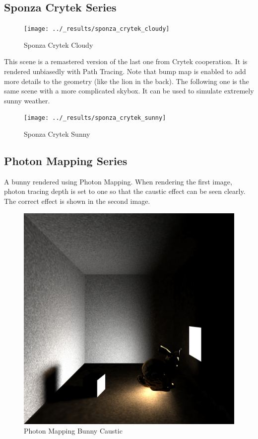 \documentclass[utf8]{article}
\begin{document}
\subsection{Sponza Crytek Series}
\begin{figure}[H]
	\centering
	\texttt{[image: ../\_results/sponza\_crytek\_cloudy]}
	\caption{Sponza Crytek Cloudy}
	\label{fig:sponzacrytekcloudy}
\end{figure}
This scene is a remastered version of the last one from Crytek cooperation. It is rendered unbiasedly with Path Tracing. Note that bump map is enabled to add more details to the geometry (like the lion in the back). The following one is the same scene with a more complicated skybox. It can be used to simulate extremely sunny weather.

\begin{figure}[H]
	\centering
	\texttt{[image: ../\_results/sponza\_crytek\_sunny]}
	\caption{Sponza Crytek Sunny}
	\label{fig:sponzacryteksunny}
\end{figure}


\subsection{Photon Mapping Series}
A bunny rendered using Photon Mapping. When rendering the first image, photon tracing depth is set to one so that the caustic effect can be seen clearly. The correct effect is shown in the second image.

\begin{figure}[H]
	\centering
	\includegraphics[width=0.5\linewidth]{../_results/photon_mapping_bunny_caustic}
	\caption{Photon Mapping Bunny Caustic}
	\label{fig:photonmappingbunnycaustic}
\end{figure}
\end{document}
